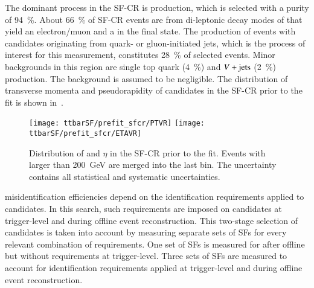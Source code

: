 The dominant process in the SF-CR is \ttbar production, which is selected with a
purity of \SI{94}{\percent}. About \SI{66}{\percent} of SF-CR events are from
di-leptonic decay modes of \ttbar that yield an electron/muon and a \tauhadvis
in the final state. The production of \ttbar events with \tauhadvis candidates
originating from quark- or gluon-initiated jets, which is the process of
interest for this measurement, constitutes \SI{28}{\percent} of selected
events. Minor backgrounds in this region are single top quark (\SI{4}{\percent})
and $V+\text{jets}$ (\SI{2}{\percent}) production. The \multijet background is assumed
to be negligible. The distribution of transverse momenta and pseudorapidity of
\tauhadvis candidates in the SF-CR prior to the fit is shown
in~.

\begin{figure}[htbp]
  \centering

  \texttt{[image: ttbarSF/prefit\_sfcr/PTVR]}%
  \texttt{[image: ttbarSF/prefit\_sfcr/ETAVR]}

  \caption{Distribution of \tauhadvis \pT and $\eta$ in the SF-CR prior to the
    fit. Events with \tauhadvis \pT larger than \SI{200}{\GeV} are merged into
    the last bin. The uncertainty contains all statistical and systematic
    uncertainties.
  }%
  \label{fig:ttbarSF_prefit_pt}
\end{figure}

\Jettotauhadvis misidentification efficiencies depend on the identification
requirements applied to \tauhadvis candidates. In this search, such requirements
are imposed on \tauhadvis candidates at trigger-level and during offline event
reconstruction. This two-stage selection of \tauhadvis candidates is taken into
account by measuring separate sets of SFs for every relevant combination of
\tauid requirements. One set of SFs is measured for \faketauhadvis after offline
\tauid but without requirements at trigger-level.
Three sets of SFs are measured to account for identification requirements
applied at trigger-level and during offline event reconstruction.

